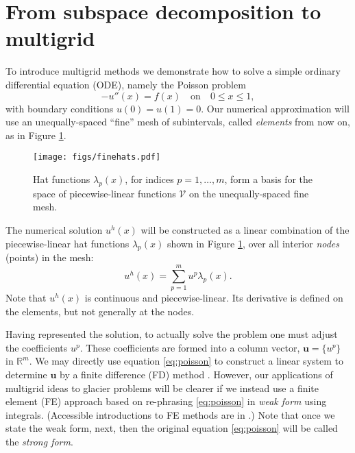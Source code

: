 \documentclass[letterpaper,final,12pt,reqno]{amsart}
\newcommand{\RR}{\mathbb{R}}
\newcommand{\bu}{\mathbf{u}}
\begin{document}
\section{From subspace decomposition to multigrid} \label{sec:subspace}

To introduce multigrid methods we demonstrate how to solve a simple ordinary differential equation (ODE), namely the Poisson problem
\begin{equation}
- u''(x) = f(x) \quad \text{on} \quad 0 \le x \le 1, \label{eq:poisson}
\end{equation}
with boundary conditions $u(0)=u(1)=0$.  Our numerical approximation will use an unequally-spaced ``fine'' mesh of subintervals, called \emph{elements} from now on, as in Figure \ref{fig:finehats}.

\begin{figure}
\texttt{[image: figs/finehats.pdf]}
\caption{Hat functions $\lambda_p(x)$, for indices $p=1,\dots,m$, form a basis for the space of piecewise-linear functions $\mathcal{V}$ on the unequally-spaced fine mesh.}
\label{fig:finehats}
\end{figure}

The numerical solution $u^h(x)$ will be constructed as a linear combination of the piecewise-linear hat functions $\lambda_p(x)$ shown in Figure \ref{fig:finehats}, over all interior \emph{nodes} (points) in the mesh:
\begin{equation}
u^h(x) = \sum_{p=1}^m u^p \lambda_p(x). \label{eq:trialsolution}
\end{equation}
Note that $u^h(x)$ is continuous and piecewise-linear.  Its derivative is defined on the elements, but not generally at the nodes.

Having represented the solution, to actually solve the problem one must adjust the coefficients $u^p$.  These coefficients are formed into a column vector, $\bu=\{u^p\}$ in $\RR^m$.  We may directly use equation \eqref{eq:poisson} to construct a linear system to determine $\bu$ by a finite difference (FD) method \cite{LeVeque2007}.  However, our applications of multigrid ideas to glacier problems will be clearer if we instead use a finite element (FE) approach based on re-phrasing \eqref{eq:poisson} in \emph{weak form} using integrals.  (Accessible introductions to FE methods are in \cite{Bueler2021,Elmanetal2014,Johnson2009}.)  Note that once we state the weak form, next, then the original equation \eqref{eq:poisson} will be called the \emph{strong form}.
\end{document}
